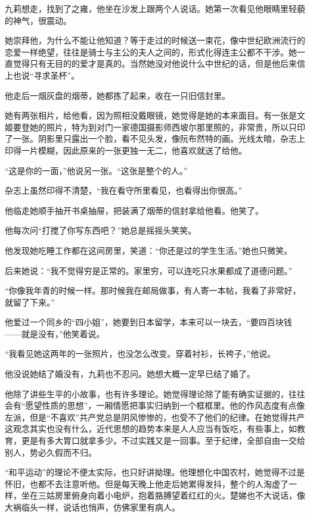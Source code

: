 \par 九莉想走，找到了之雍，他坐在沙发上跟两个人说话。她第一次看见他眼睛里轻藐的神气，很震动。
\par 她崇拜他，为什么不能让他知道？等于走过的时候送一束花，像中世纪欧洲流行的恋爱一样绝望，往往是骑士与主公的夫人之间的，形式化得连主公都不干涉。她一直觉得只有无目的的爱才是真的。当然她没对他说什么中世纪的话，但是他后来信上也说“寻求圣杯”。
\par 他走后一烟灰盘的烟蒂，她都拣了起来，收在一只旧信封里。
\par 她有两张相片，给他看，因为照相没戴眼镜，她觉得是她的本来面目。有一张是文姬要登她的照片，特为到对门一家德国摄影师西坡尔那里照的，非常贵，所以只印了一张。阴影里只露出一个脸，看不见头发，像阮布然特的画。光线太暗，杂志上印得一片模糊，因此原来的一张更独一无二，他喜欢就送了给他。
\par “这是你的一面，”他说另一张。“这张是整个的人。”
\par 杂志上虽然印得不清楚，“我在看守所里看见，也看得出你很高。”
\par 他临走她顺手抽开书桌抽屉，把装满了烟蒂的信封拿给他看。他笑了。
\par 他每次问“打搅了你写东西吧？”她总是摇摇头笑笑。
\par 他发现她吃睡工作都在这间房里，笑道：“你还是过的学生生活。”她也只微笑。
\par 后来她说：“我不觉得穷是正常的。家里穷，可以连吃只水果都成了道德问题。”
\par “你像我年青的时候一样。那时候我在邮局做事，有人寄一本帖，我看了非常好，就留了下来。”
\par 他爱过一个同乡的“四小姐”，她要到日本留学，本来可以一块去，“要四百块钱——就是没有，”他笑着说。
\par “我看见她这两年的一张照片，也没怎么改变。穿着衬衫，长袴子，”他说。
\par 他没说她结了婚没有，九莉也不忍问。她想大概一定早已结了婚了。
\par 他除了讲些生平的小故事，也有许多理论。她觉得理论除了能有确实证据的，往往会有“愿望性质的思想”，一厢情愿把事实归纳到一个框框里。他的作风态度有点像左派，但是“不喜欢”共产党总是阴风惨惨的，也受不了他们的纪律。在她觉得共产这观念其实也没有什么，近代思想的趋势本来是人人应当有饭吃，有些事上，如教育，更是有多大胃口就拿多少。不过实践又是一回事。至于纪律，全部自由一交给别人，势必久假而不归。
\par “和平运动”的理论不便太实际，也只好讲拗理。他理想化中国农村，她觉得不过是怀旧，也都不去注意听他。但是每天晚上他走后她累得发抖，整个的人淘虚了一样，坐在三姑房里俯身向着小电炉，抱着胳膊望着红红的火。楚娣也不大说话，像大祸临头一样，说话也悄声，仿佛家里有病人。

